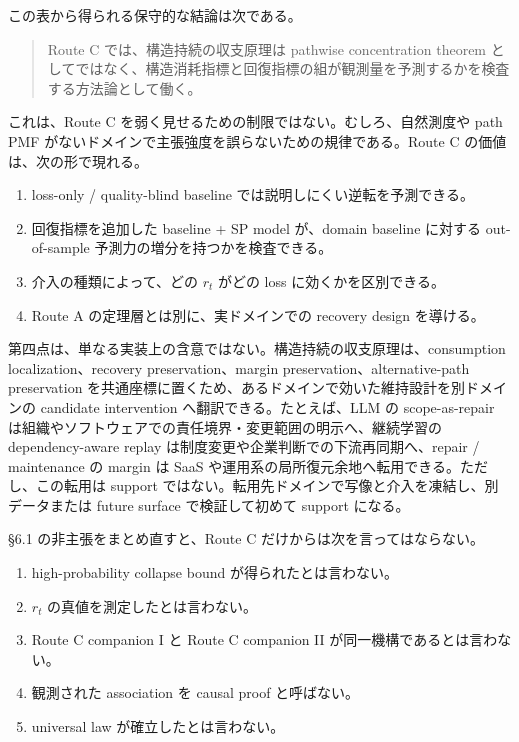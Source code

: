 \documentclass[12pt,a4paper]{article}
\begin{document}
この表から得られる保守的な結論は次である。

\begin{quote}
Route C では、構造持続の収支原理は pathwise concentration theorem としてではなく、構造消耗指標と回復指標の組が観測量を予測するかを検査する方法論として働く。
\end{quote}

これは、Route C を弱く見せるための制限ではない。むしろ、自然測度や path PMF がないドメインで主張強度を誤らないための規律である。Route C の価値は、次の形で現れる。

\begin{enumerate}
\def\labelenumi{\arabic{enumi}.}
\tightlist
\item
  loss-only / quality-blind baseline では説明しにくい逆転を予測できる。
\item
  回復指標を追加した baseline + SP model が、domain baseline に対する out-of-sample 予測力の増分を持つかを検査できる。
\item
  介入の種類によって、どの \(r_{t}\) がどの loss に効くかを区別できる。
\item
  Route A の定理層とは別に、実ドメインでの recovery design を導ける。
\end{enumerate}

第四点は、単なる実装上の含意ではない。構造持続の収支原理は、consumption localization、recovery preservation、margin preservation、alternative-path preservation を共通座標に置くため、あるドメインで効いた維持設計を別ドメインの candidate intervention へ翻訳できる。たとえば、LLM の scope-as-repair は組織やソフトウェアでの責任境界・変更範囲の明示へ、継続学習の dependency-aware replay は制度変更や企業判断での下流再同期へ、repair / maintenance の margin は SaaS や運用系の局所復元余地へ転用できる。ただし、この転用は support ではない。転用先ドメインで写像と介入を凍結し、別データまたは future surface で検証して初めて support になる。

§6.1 の非主張をまとめ直すと、Route C だけからは次を言ってはならない。

\begin{enumerate}
\def\labelenumi{\arabic{enumi}.}
\tightlist
\item
  high-probability collapse bound が得られたとは言わない。
\item
  \(r_{t}\) の真値を測定したとは言わない。
\item
  Route C companion I と Route C companion II が同一機構であるとは言わない。
\item
  観測された association を causal proof と呼ばない。
\item
  universal law が確立したとは言わない。
\end{enumerate}
\end{document}
